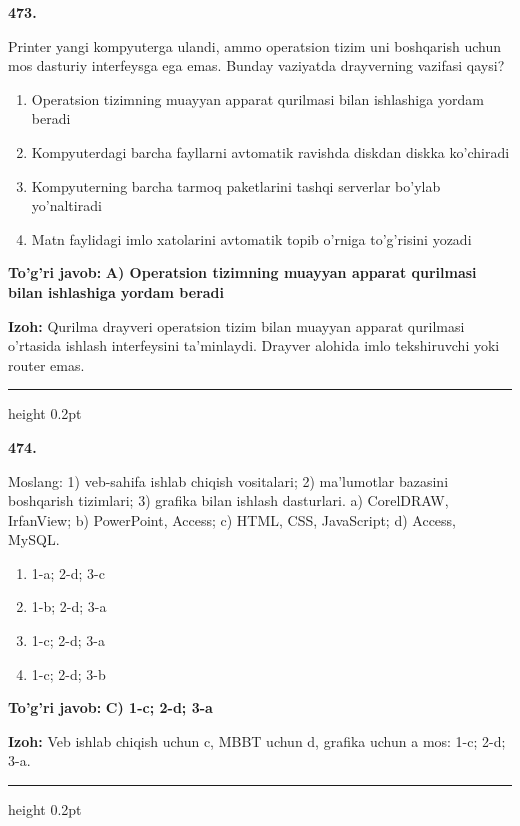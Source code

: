 \documentclass[10pt,a4paper]{article}
\begin{document}
{\bfseries\sffamily\color{ink} 473.}
\par
Printer yangi kompyuterga ulandi, ammo operatsion tizim uni boshqarish uchun mos dasturiy interfeysga ega emas. Bunday vaziyatda drayverning vazifasi qaysi?
\begin{enumerate}[label=\Alph*),leftmargin=9mm]
\item Operatsion tizimning muayyan apparat qurilmasi bilan ishlashiga yordam beradi
\item Kompyuterdagi barcha fayllarni avtomatik ravishda diskdan diskka ko'chiradi
\item Kompyuterning barcha tarmoq paketlarini tashqi serverlar bo'ylab yo'naltiradi
\item Matn faylidagi imlo xatolarini avtomatik topib o'rniga to'g'risini yozadi
\end{enumerate}
\begin{tcolorbox}[enhanced,breakable,colback=teal!4,colframe=teal!60!black,boxrule=0.45pt,arc=1.2mm,left=2.7mm,right=2.7mm,top=1.8mm,bottom=1.8mm,before skip=2mm,after skip=2mm]
{\bfseries\sffamily\color{teal}To'g'ri javob:} \textbf{A) Operatsion tizimning muayyan apparat qurilmasi bilan ishlashiga yordam beradi}
\par\smallskip
{\bfseries Izoh:} Qurilma drayveri operatsion tizim bilan muayyan apparat qurilmasi o'rtasida ishlash interfeysini ta'minlaydi. Drayver alohida imlo tekshiruvchi yoki router emas.
\end{tcolorbox}
\vspace{2mm}\hrule height 0.2pt\vspace{3mm}

{\bfseries\sffamily\color{ink} 474.}
\par
Moslang: 1) veb-sahifa ishlab chiqish vositalari; 2) ma'lumotlar bazasini boshqarish tizimlari; 3) grafika bilan ishlash dasturlari. a) CorelDRAW, IrfanView; b) PowerPoint, Access; c) HTML, CSS, JavaScript; d) Access, MySQL.
\begin{enumerate}[label=\Alph*),leftmargin=9mm]
\item 1-a; 2-d; 3-c
\item 1-b; 2-d; 3-a
\item 1-c; 2-d; 3-a
\item 1-c; 2-d; 3-b
\end{enumerate}
\begin{tcolorbox}[enhanced,breakable,colback=teal!4,colframe=teal!60!black,boxrule=0.45pt,arc=1.2mm,left=2.7mm,right=2.7mm,top=1.8mm,bottom=1.8mm,before skip=2mm,after skip=2mm]
{\bfseries\sffamily\color{teal}To'g'ri javob:} \textbf{C) 1-c; 2-d; 3-a}
\par\smallskip
{\bfseries Izoh:} Veb ishlab chiqish uchun c, MBBT uchun d, grafika uchun a mos: 1-c; 2-d; 3-a.
\end{tcolorbox}
\vspace{2mm}\hrule height 0.2pt\vspace{3mm}
\end{document}
